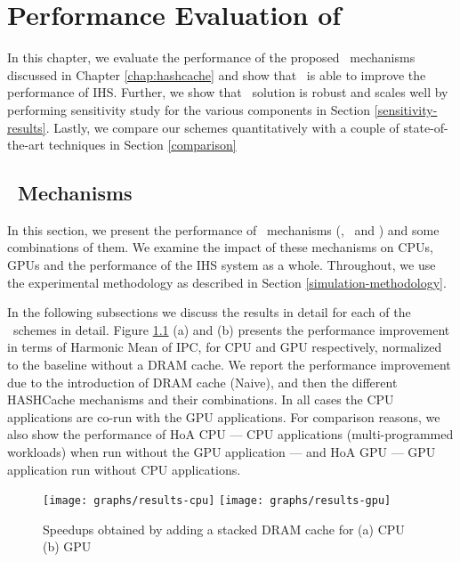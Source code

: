 \chapter{Performance Evaluation of \cachename} \label{chap:results}
In this chapter, we evaluate the performance of the proposed \cachename\ mechanisms discussed in Chapter \ref{chap:hashcache} and show that \cachename\ is able to improve the performance of IHS. Further, we show that \cachename\ solution is robust and scales well by performing sensitivity study for the various components in Section \ref{sensitivity-results}. Lastly, we compare our schemes quantitatively with a couple of state-of-the-art techniques in Section \ref{comparison}

\section{\cachename\ Mechanisms}
In this section, we present the performance of \cachename\ mechanisms (\prioname, \bypassname\ and \chaining) and some combinations of them. We examine the impact of these mechanisms on CPUs, GPUs and the performance of the IHS system as a whole. Throughout, we use the experimental methodology as described in Section \ref{simulation-methodology}. 
\par In the following subsections we discuss the results in detail for each of the \cachename\ schemes in detail. Figure \ref{results-speedup} (a) and (b) presents the performance improvement in terms of Harmonic Mean of IPC, for CPU and GPU respectively, normalized to the baseline without a DRAM cache. We report the performance improvement due to the introduction of DRAM cache (Naive),  and then the different HASHCache mechanisms  and their combinations. In all cases the CPU applications are co-run with the GPU applications. For comparison reasons, we also show the performance of HoA CPU --- CPU applications (multi-programmed workloads) when run without the GPU application --- and  HoA GPU --- GPU application run without CPU applications.

\begin{figure}[htb]
	\centering
	\texttt{[image: graphs/results-cpu]}
	\texttt{[image: graphs/results-gpu]}
	\caption{Speedups obtained by adding a stacked DRAM cache for (a) CPU (b) GPU}
	\label{results-speedup}
\end{figure}

